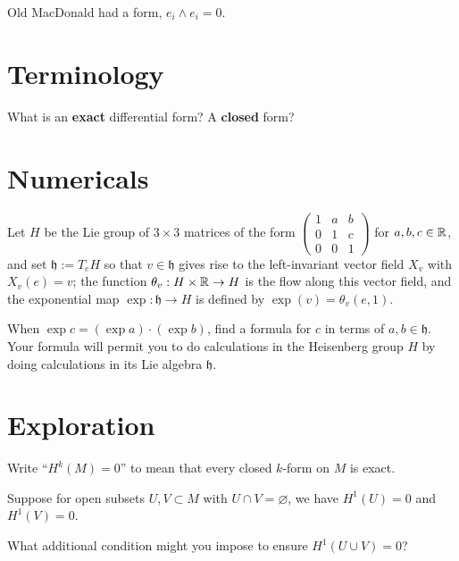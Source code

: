 \documentclass{homework}
\author{Jim Fowler}
\begin{document}
\maketitle

\begin{inspiration}
  Old MacDonald had a form, $e_i \wedge e_i = 0$. 
\end{inspiration}

\section{Terminology}

\begin{problem}
  What is an \textbf{exact} differential form?  A \textbf{closed} form?
\end{problem}

\section{Numericals}

\begin{problem} Let $H$ be the Lie group of $3 \times 3$ matrices of
the form 
  $\displaystyle\begin{pmatrix}
    1 & a & b \\
    0 & 1 & c \\
    0 & 0 & 1
  \end{pmatrix}$ for $a, b, c \in \mathbb{R}$, and set $\mathfrak{h} := T_e H$
so that $v \in \mathfrak{h}$ gives rise to the left-invariant vector
field $X_v$ with $X_v(e) = v$; the function $\theta_{v} : H \times \mathbb{R}
\to H$ is the flow along this vector field, and the exponential map
$\exp : \mathfrak{h} \to H$ is defined by $\exp(v) = \theta_v(e,1)$.

When $\exp c = (\exp a) \cdot (\exp b)$, find a formula for $c$ in
terms of $a, b \in \mathfrak{h}$.  Your formula will permit you to do
calculations in the Heisenberg group $H$ by doing calculations in its Lie
algebra $\mathfrak{h}$.
\end{problem}

\section{Exploration}

\begin{problem}
Write ``$H^k(M) = 0$'' to mean that every closed $k$-form on $M$ is exact.

  Suppose for open subsets $U, V \subset M$ with $U \cap V =
  \varnothing$, we have $H^1(U) = 0$ and $H^1(V) = 0$.

  What additional condition might you impose to ensure $H^1(U \cup V)
= 0$?
\end{problem}
\end{document}

